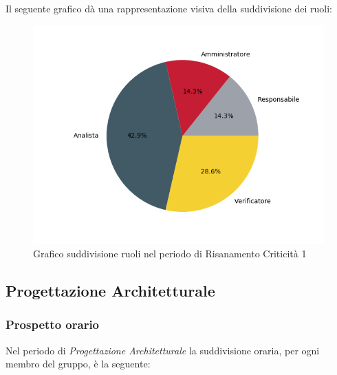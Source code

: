 Il seguente grafico dà una rappresentazione visiva della suddivisione dei ruoli:
\begin{figure}[H]
	\centering
  		\includegraphics[width=1\linewidth]{./images/torta_rc1.png}
  		\caption{Grafico suddivisione ruoli nel periodo di Risanamento Criticità 1}
  		\label{fig:grafico suddivione ruoli periodo di rc1}
\end{figure}

\newpage
\subsection{Progettazione Architetturale}
\label{PPA}
\subsubsection{Prospetto orario}

Nel periodo di \textit{Progettazione Architetturale} la suddivisione oraria, per ogni membro del gruppo, è la seguente:


